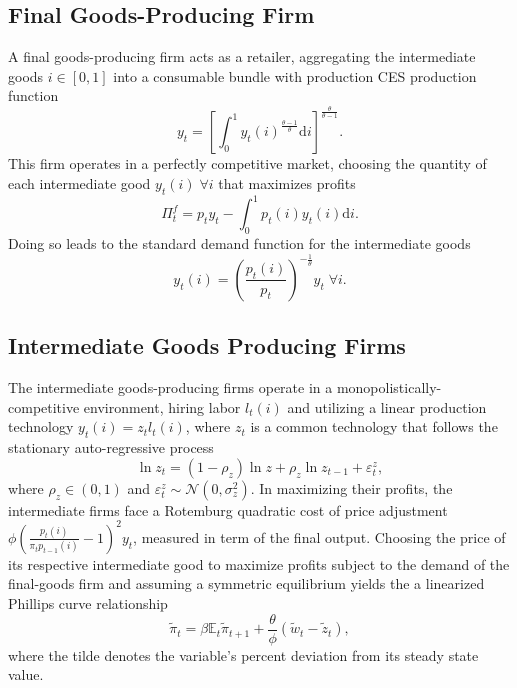 \documentclass[11pt,a4paper,margin=1.5in]{article}
\begin{document}
\subsection{Final Goods-Producing Firm}
A final goods-producing firm acts as a retailer, aggregating the intermediate goods $i\in[0,1]$ into a consumable bundle with production CES production function
\begin{equation}
\label{eq:FinalGoods_Production}
	y_t = \left[\int^1_0 y_t(i)^{\frac{\theta-1}{\theta}}\mathrm{d}i\right]^\frac{\theta}{\theta-1}.
\end{equation}
This firm operates in a perfectly competitive market, choosing the quantity of each intermediate good $y_t(i)\; \forall i$ that maximizes profits
\begin{equation}
\label{eq:FinalGoods_Profit}
	\Pi_t^f = p_ty_t - \int_0^1p_t(i)y_t(i)\mathrm{d}i.
\end{equation}
Doing so leads to the standard demand function for the intermediate goods
\begin{equation}
\label{eq:FinalGoods_FOC}
	y_t(i) = \left(\frac{p_t(i)}{p_t}\right)^{-\frac{1}{\theta}}y_t \; \forall i.
\end{equation}

\subsection{Intermediate Goods Producing Firms}
The intermediate goods-producing firms operate in a monopolistically-competitive environment, hiring labor $l_t(i)$ and utilizing a linear production technology $y_t(i) = z_tl_t(i)$, where $z_t$ is a common technology that follows the stationary auto-regressive process
\begin{equation}
\label{eq:Technology}
	\ln z_t = (1-\rho_z)\ln z + \rho_z \ln z_{t-1} + \varepsilon^z_t,
\end{equation}
where $\rho_z \in (0,1)$ and $\varepsilon^z_t \sim \mathcal{N}(0,\sigma^2_z)$.
In maximizing their profits, the intermediate firms face a Rotemburg quadratic cost of price adjustment $\phi\left(\frac{p_t(i)}{\pi_t p_{t-1}(i)} - 1\right)^2y_t$, measured in term of the final output.
Choosing the price of its respective intermediate good to maximize profits subject to the demand of the final-goods firm and assuming a symmetric equilibrium yields the a linearized Phillips curve relationship
\begin{equation}
\label{eq:NKPC}
	\tilde{\pi}_t = \beta\mathbb{E}_t\tilde{\pi}_{t+1} + \frac{\theta}{\phi}(\tilde{w}_t - \tilde{z}_t),
\end{equation}
where the tilde denotes the variable's percent deviation from its steady state value.
\end{document}
